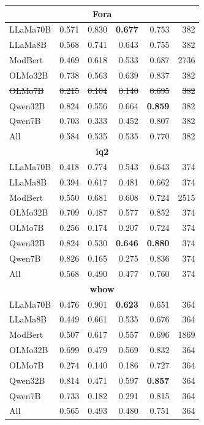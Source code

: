 \documentclass[11pt]{article}
\theoremstyle{definition}
\theoremstyle{plain}
\begin{document}
\begin{table}[t]
\begin{tabular}{lrrrrr}
		\midrule
		\multicolumn{6}{c}{\textbf{Fora}} \\
		\midrule
		LLaMa70B & 0.571 & 0.830 & \textbf{0.677} & 0.753 & 382 \\
		LLaMa8B  & 0.568 & 0.741 & 0.643 & 0.755 & 382 \\
		ModBert  & 0.469 & 0.618 & 0.533 & 0.687 & 2736 \\
		OLMo32B  & 0.738 & 0.563 & 0.639 & 0.837 & 382 \\
		\st{OLMo7B} & \st{0.215} & \st{0.104} & \st{0.140} & \st{0.695} & \st{382} \\
		Qwen32B  & 0.824 & 0.556 & 0.664 & \textbf{0.859} & 382 \\
		Qwen7B   & 0.703 & 0.333 & 0.452 & 0.807 & 382 \\
		{All} & {0.584} & {0.535} & {0.535} & {0.770} & {382} \\
		
		\midrule
		\multicolumn{6}{c}{\textbf{\acs{iq2}}} \\
		\midrule
		LLaMa70B & 0.418 & 0.774 & 0.543 & 0.643 & 374 \\
		LLaMa8B  & 0.394 & 0.617 & 0.481 & 0.662 & 374 \\
		ModBert  & 0.550 & 0.681 & 0.608 & 0.724 & 2515 \\
		OLMo32B  & 0.709 & 0.487 & 0.577 & 0.852 & 374 \\
		OLMo7B   & 0.256 & 0.174 & 0.207 & 0.724 & 374 \\
		Qwen32B  & 0.824 & 0.530 & \textbf{0.646} & \textbf{0.880} & 374 \\
		Qwen7B   & 0.826 & 0.165 & 0.275 & 0.836 & 374 \\
		{All} & {0.568} & {0.490} & {0.477} & {0.760} & {374} \\
		
		\midrule
		\multicolumn{6}{c}{\textbf{\acs{whow}}} \\
		\midrule
		LLaMa70B & 0.476 & 0.901 & \textbf{0.623} & 0.651 & 364 \\
		LLaMa8B  & 0.449 & 0.661 & 0.535 & 0.676 & 364 \\
		ModBert  & 0.507 & 0.617 & 0.557 & 0.696 & 1869 \\
		OLMo32B  & 0.699 & 0.479 & 0.569 & 0.832 & 364 \\
		OLMo7B   & 0.274 & 0.140 & 0.186 & 0.727 & 364 \\
		Qwen32B  & 0.814 & 0.471 & 0.597 & \textbf{0.857} & 364 \\
		Qwen7B   & 0.733 & 0.182 & 0.291 & 0.815 & 364 \\
		{All} & {0.565} & {0.493} & {0.480} & {0.751} & {364} \\
		

\end{tabular}
\end{table}
\end{document}
